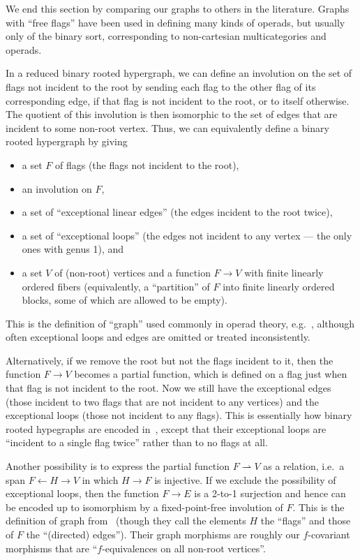 \documentclass{article}
\theoremstyle{definition}
\theoremstyle{remark}
\let\ot\leftarrow
\begin{document}
We end this section by comparing our graphs to others in the literature.
Graphs with ``free flags'' have been used in defining many kinds of operads, but usually only of the binary sort, corresponding to non-cartesian multicategories and operads.

In a reduced binary rooted hypergraph, we can define an involution on the set of flags not incident to the root by sending each flag to the other flag of its corresponding edge, if that flag is not incident to the root, or to itself otherwise.
The quotient of this involution is then isomorphic to the set of edges that are incident to some non-root vertex.
Thus, we can equivalently define a binary rooted hypergraph by giving
\begin{itemize}
\item a set $F$ of flags (the flags not incident to the root),
\item an involution on $F$,
\item a set of ``exceptional linear edges'' (the edges incident to the root twice),
\item a set of ``exceptional loops'' (the edges not incident to any vertex --- the only ones with genus 1), and
\item a set $V$ of (non-root) vertices and a function $F\to V$ with finite linearly ordered fibers (equivalently, a ``partition'' of $F$ into finite linearly ordered blocks, some of which are allowed to be empty).
\end{itemize}
This is the definition of ``graph'' used commonly in operad theory, e.g.~\cite{bm:gen-opds,km:gwcqceg,costello:ainf,mms:wheeled-props,gk:modular-operads}, although often exceptional loops and edges are omitted or treated inconsistently.

Alternatively, if we remove the root but not the flags incident to it, then the function $F\to V$ becomes a partial function, which is defined on a flag just when that flag is not incident to the root.
Now we still have the exceptional edges (those incident to two flags that are not incident to any vertices) and the exceptional loops (those not incident to any flags).
This is essentially how binary rooted hypegraphs are encoded in~\cite{bb:htapm}, except that their exceptional loops are ``incident to a single flag twice'' rather than to no flags at all.

Another possibility is to express the partial function $F\rightharpoonup V$ as a relation, i.e.\ a span $F \ot H \to V$ in which $H\to F$ is injective.
If we exclude the possibility of exceptional loops, then the function $F\to E$ is a 2-to-1 surjection and hence can be encoded up to isomorphism by a fixed-point-free involution of $F$.
This is the definition of graph from~\cite{jk:feynman} (though they call the elements $H$ the ``flags'' and those of $F$ the ``(directed) edges'').
Their graph morphisms are roughly our $f$-covariant morphisms that are ``$f$-equivalences on all non-root vertices''.
\end{document}
